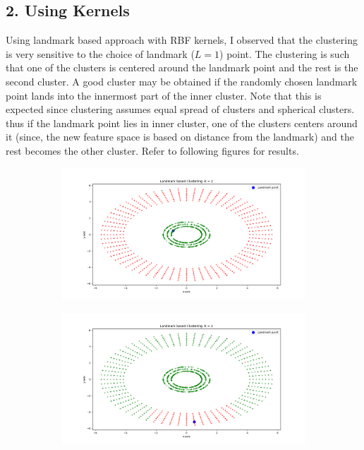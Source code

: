 \documentclass[a4paper,11pt]{article}
\begin{document}
\begin{mlsolution}
\subsection{2. Using Kernels}
Using landmark based approach with RBF kernels, I observed that the clustering is very sensitive to the choice of landmark ($L=1$) point. The clustering is such that one of the clusters is centered around the landmark point and the rest is the second cluster. A good cluster may be obtained if the randomly chosen landmark point lands into the innermost part of the inner cluster. Note that this is expected since clustering assumes equal spread of clusters and spherical clusters. thus if the landmark point lies in inner cluster, one of the clusters centers around it (since, the new feature space is based on distance from the landmark) and the rest becomes the other cluster.
Refer to following figures  for results.
\begin{figure}[!htbp]
	\begin{subfigure}{0.5\textwidth}
		\centering
		\includegraphics[width=1.1\textwidth]{images/l_random1.png}
		\caption{}
		\label{l1}
	\end{subfigure}
	\begin{subfigure}{0.5\textwidth}
		\centering
		\includegraphics[width=1.1\textwidth]{images/l_random2.png}

\end{subfigure}
\end{figure}
\end{mlsolution}
\end{document}
